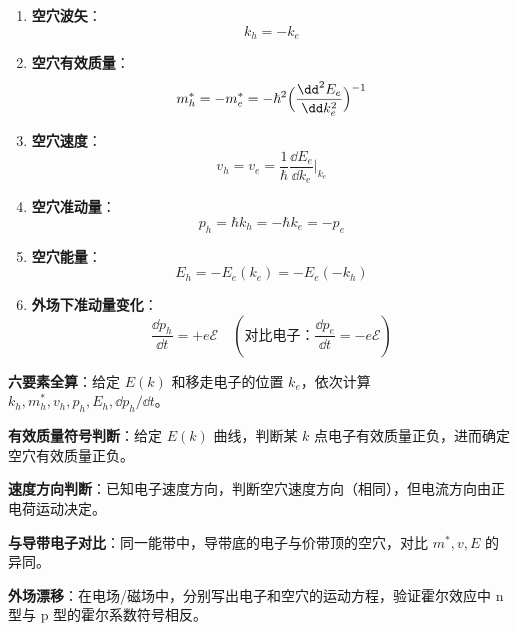 \begin{formulabox}[核心公式]
\begin{enumerate}[label=\textbf{(\arabic*)}]
    \item \textbf{空穴波矢}：
    \[
    k_h=-k_e
    \]

    \item \textbf{空穴有效质量}：
    \[
    m_h^*=-m_e^*=-\hbar^2\Bigl(\frac{\dd^2E_e}{\dd k_e^2}\Bigr)^{-1}
    \]

    \item \textbf{空穴速度}：
    \[
    v_h=v_e=\frac{1}{\hbar}\frac{\dd E_e}{\dd k_e}\bigg|_{k_e}
    \]

    \item \textbf{空穴准动量}：
    \[
    p_h=\hbar k_h=-\hbar k_e=-p_e
    \]

    \item \textbf{空穴能量}：
    \[
    E_h=-E_e(k_e)=-E_e(-k_h)
    \]

    \item \textbf{外场下准动量变化}：
    \[
    \frac{\dd p_h}{\dd t}=+e\mathcal{E}\quad(\text{对比电子：}\frac{\dd p_e}{\dd t}=-e\mathcal{E})
    \]
\end{enumerate}
\end{formulabox}

\begin{drillbox}[训练点与考法变体]
 \textbf{六要素全算}：给定 $E(k)$ 和移走电子的位置 $k_e$，依次计算 $k_h, m_h^*, v_h, p_h, E_h, \dd p_h/\dd t$。

 \textbf{有效质量符号判断}：给定 $E(k)$ 曲线，判断某 $k$ 点电子有效质量正负，进而确定空穴有效质量正负。

 \textbf{速度方向判断}：已知电子速度方向，判断空穴速度方向（相同），但电流方向由正电荷运动决定。

 \textbf{与导带电子对比}：同一能带中，导带底的电子与价带顶的空穴，对比 $m^*, v, E$ 的异同。

 \textbf{外场漂移}：在电场/磁场中，分别写出电子和空穴的运动方程，验证霍尔效应中 n 型与 p 型的霍尔系数符号相反。
\end{drillbox}

